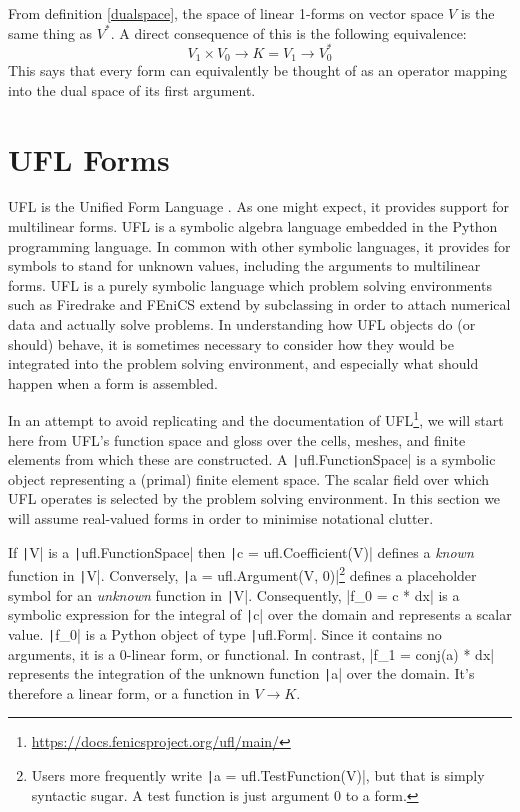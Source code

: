 \documentclass[a4paper,11pt]{article}
\begin{document}
From definition \ref{dualspace}, the space of linear 1-forms on vector space $V$ is the same thing as $V^*$. 
A direct consequence of this is the following equivalence:
\begin{equation} 
    V_1 \times V_0 \rightarrow K = V_1 \rightarrow V_0^*
\end{equation}
This says that every form can equivalently be thought of as an operator mapping into the dual space of its first argument.

\section{UFL Forms}

UFL is the Unified Form Language \parencite{alnaes2014}. As one might expect, it provides support for multilinear forms. UFL is a symbolic algebra language embedded in the Python programming language. In common with other symbolic languages, it provides for symbols to stand for unknown values, including the arguments to multilinear forms. UFL is a purely symbolic language which problem solving environments such as Firedrake and FEniCS extend by subclassing in order to attach numerical data and actually solve problems. In understanding how UFL objects do (or should) behave, it is sometimes necessary to consider how they would be integrated into the problem solving environment, and especially what should happen when a form is assembled.

In an attempt to avoid replicating \textcite{alnaes2014} and the documentation of UFL\footnote{\url{https://docs.fenicsproject.org/ufl/main/}}, we will start here from UFL's function space and gloss over the cells, meshes, and finite elements from which these are constructed. A \texttt|ufl.FunctionSpace| is a symbolic object representing a (primal) finite element space. The scalar field over which UFL operates is selected by the problem solving environment. In this section we will assume real-valued forms in order to minimise notational clutter.

If \texttt|V| is a \texttt|ufl.FunctionSpace| then \texttt|c = ufl.Coefficient(V)| defines a \emph{known} function in \texttt|V|. Conversely, \texttt|a = ufl.Argument(V, 0)|\footnote{Users more frequently write \texttt|a = ufl.TestFunction(V)|, but that is simply syntactic sugar. A test function is just argument 0 to a form.} defines a placeholder symbol for an \emph{unknown} function in \texttt|V|.
Consequently, 
|f_0 = c * dx| 
is a symbolic expression for the integral of \texttt|c| over the domain and represents a scalar value. \texttt|f_0| is a Python object of type \texttt|ufl.Form|. Since it contains no arguments, it is a 0-linear form, or functional. In contrast, 
|f_1 = conj(a) * dx|
represents the integration of the unknown function \texttt|a| over the domain. It's therefore a linear form, or a function in $V\rightarrow K$.
\end{document}
